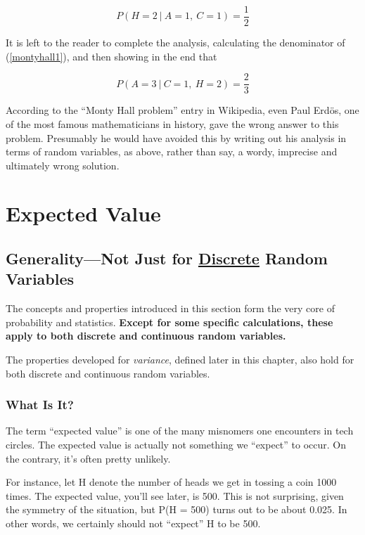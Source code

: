 \begin{equation}
P(H = 2 ~|~ A = 1, ~ C = 1) = \frac{1}{2}
\end{equation}

It is left to the reader to complete the analysis, calculating the
denominator of (\ref{montyhall1}), and then showing in the end that

\begin{equation}
P(A = 3 ~|~ C = 1, ~ H = 2) = \frac{2}{3}
\end{equation}

According to the ``Monty Hall problem'' entry in Wikipedia, even Paul
Erd{\"o}s, one of the most famous mathematicians in history, gave the wrong
answer to this problem.  Presumably he would have avoided this by
writing out his analysis in terms of random variables, as above, rather
than say, a wordy, imprecise and ultimately wrong solution.

\section{Expected Value}
\label{expval}

\subsection{Generality---Not Just for \underline{Discrete} Random
Variables}

The concepts and properties introduced in this section form the very
core of probability and statistics.  {\bf Except for some specific
calculations, these apply to both discrete and continuous random
variables.}

The properties developed for {\it variance}, defined later in this
chapter, also hold for both discrete and continuous random variables.

\subsubsection{What Is It?}
\label{whatisit}

The term ``expected value'' is one of the many misnomers one encounters
in tech circles.  The expected value is actually not something we
``expect'' to occur.  On the contrary, it's often pretty unlikely.

For instance, let H denote the number of heads we get in tossing a coin
1000 times.  The expected value, you'll see later, is 500.  This is not
surprising, given the symmetry of the situation, but P(H = 500) turns
out to be about 0.025.  In other words, we certainly should not
``expect'' H to be 500.

